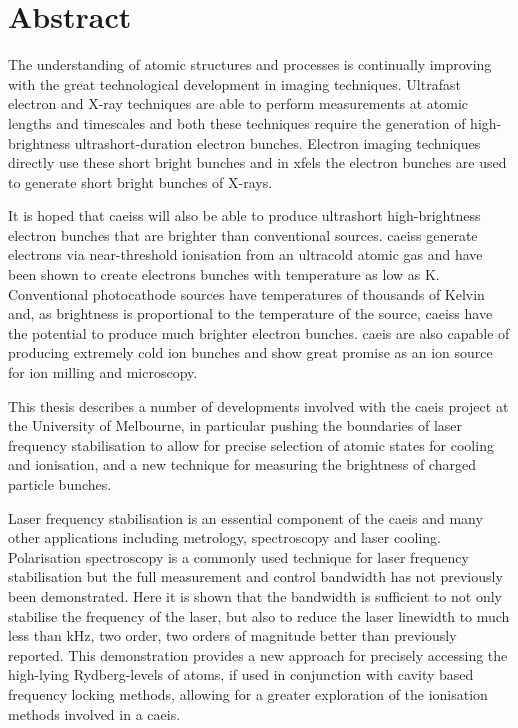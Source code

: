 \chapter*{Abstract}

The understanding of atomic structures and processes is continually improving with the great technological development in imaging techniques.
Ultrafast electron and X-ray techniques are able to perform measurements at atomic lengths and timescales and both these techniques require the generation of high-brightness ultrashort-duration electron bunches.
Electron imaging techniques directly use these short bright bunches and in \glspl{xfel} the electron bunches are used to generate short bright bunches of X-rays.

It is hoped that \glspl{caeis} will also be able to produce ultrashort high-brightness electron bunches that are brighter than conventional sources.
\Glspl{caeis} generate electrons via near-threshold ionisation from an ultracold atomic gas and have been shown to create electrons bunches with temperature as low as \unit[10]{K}.
Conventional photocathode sources have temperatures of thousands of Kelvin and, as brightness is proportional to the temperature of the source, \glspl{caeis} have the potential to produce much brighter electron bunches.
\Gls{caeis} are also capable of producing extremely cold ion bunches and show great promise as an ion source for ion milling and microscopy.

This thesis describes a number of developments involved with the \gls{caeis} project at the University of Melbourne, in particular pushing the boundaries of laser frequency stabilisation to allow for precise selection of atomic states for cooling and ionisation, and a new technique for measuring the brightness of charged particle bunches.

Laser frequency stabilisation is an essential component of the \gls{caeis} and many other applications including metrology, spectroscopy and laser cooling.
Polarisation spectroscopy is a commonly used technique for laser frequency stabilisation but the full measurement and control bandwidth has not previously been demonstrated.
Here it is shown that the bandwidth is sufficient to not only stabilise the frequency of the laser, but also to reduce the laser linewidth to much less than \unit[1]{kHz}, two order, two orders of magnitude better than previously reported.
This demonstration provides a new approach for precisely accessing the high-lying Rydberg-levels of atoms, if used in conjunction with cavity based frequency locking methods, allowing for a greater exploration of the ionisation methods involved in a \gls{caeis}.

